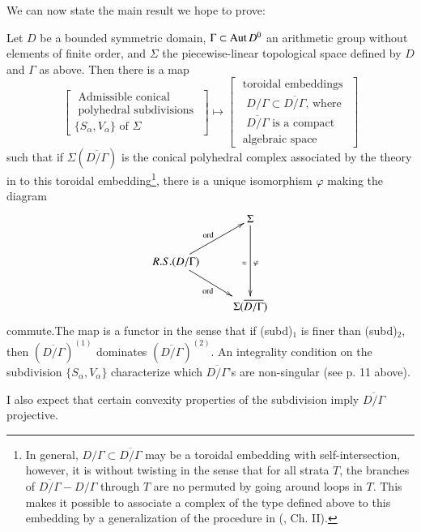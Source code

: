 We can now state the main result we hope to prove:

\begin{maintheorem*}[(?)~]
Let $D$ be a bounded symmetric domain, $\Gamma \subset \operatorname{Aut} D^0$ an arithmetic group without elements of finite order, and $\Sigma$ the piecewise-linear topological space defined by $D$ and $\Gamma$ as above. Then there is a map
$$
\begin{bmatrix}
\text{ Admissible conical }\\
\text{ polyhedral subdivisions }\\
\{S_\alpha, V_\alpha\} \text{ of } \Sigma
\end{bmatrix} 
\longmapsto
\begin{bmatrix}
\text{ toroidal embeddings }\\
\text{ $D/ \Gamma \subset \overline{D/ \Gamma}$, where }\\
\text{ $\overline{D/ \Gamma}$ is a compact }\\
\text{ algebraic space }
\end{bmatrix}
$$
such that if $\Sigma (\overline{D/\Gamma})$ is the conical polyhedral complex associated by the theory in \cite{art8-key8} to this toroidal embedding\footnote{In general, $D/\Gamma \subset \overline{D/\Gamma}$ may be a toroidal embedding with self-intersection, however, it is without twisting in the sense that for all strata $T$, the branches of $\overline{D/\Gamma}-D/\Gamma$ through $T$ are no permuted by going around loops in $T$. This makes it possible to associate a complex of the type defined above to this embedding by a generalization of the procedure in (\cite{art8-key8}, Ch. II).}, there is a unique isomorphism $\varphi$ making the diagram
$$
\xymatrix{
& \Sigma\ar[dd]^\varphi_{\approx}\\
R. S. (D/ \Gamma) \ar[ur]^{\text{ord}}\ar[dr]_{\text{ord}}& \\
& \Sigma (\overline{D/\Gamma})
}
$$
commute.\pageoriginale The map is a functor in the sense that if (subd)$_1$ is finer than (subd)$_2$, then $(\overline{D/\Gamma})^{(1)}$ dominates $(\overline{D/\Gamma})^{(2)}$. An integrality condition on the subdivision $\{S_\alpha, V_\alpha\}$ characterize which $\overline{D/\Gamma}$'s are non-singular (see p. 11 above).
\end{maintheorem*}

I also expect that certain convexity properties of the subdivision imply $\overline{D/\Gamma}$ projective.

